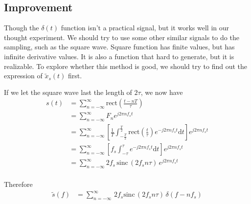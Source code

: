 \documentclass{article}
\begin{document}
\subsection{Improvement}

Though the $\delta (t)$ function isn't a practical signal, but it works well
in our thought experiment. We should try to use some other similar signals to
do the sampling, such as the square wave. Square function has finite values,
but has infinite derivative values. It is also a function that hard to
generate, but it is realizable. To explore whether this method is good, we
should try to find out the expression of $\widetilde{x}_s(t)$ first.

If we let the square wave last the length of $2\tau$, we now have
\begin{equation}
    \begin{aligned} s(t) & = \sum_{n = -\infty}^{\infty} \mathrm{rect} (\frac
     {t - nT}{\tau})                                    \\
             & = \sum_{n =-\infty}^{\infty}F_n e^{j2 \pi n f_s t}  \\
             & = \sum_{n = -\infty}^{\infty}\left[ \frac{1}{T} \int_
               {-\frac T2}^{\frac T2} \mathrm{rect}(\frac{t}{\tau}) e^
               {-j2 \pi n f_s t} \mathrm{d}t \right] e^{j2 \pi n f_s t} \\
             & = \sum_{n = -\infty}^{\infty}\left[ f_s \int_{-\tau}^{\tau} e^
               {-j2 \pi n f_s t} \mathrm{d}t \right] e^{j2 \pi n f_s t}  \\
             & = \sum_{n = -\infty}^{\infty}2f_s\, \mathrm{sinc} \,( 2f_s
               n\tau)\, e^{j2 \pi n f_s t} \label{rect_st}           \\
    \end{aligned}
\end{equation}

Therefore
\begin{equation}
    \begin{aligned}
        \widetilde{s}(f) & = \sum_{n = -\infty}^{\infty}\, 2f_s \mathrm
         {sinc}\, ( 2f_s n\tau)\, \delta(f - nf_s) \\
    \end{aligned}
\end{equation}
\end{document}
